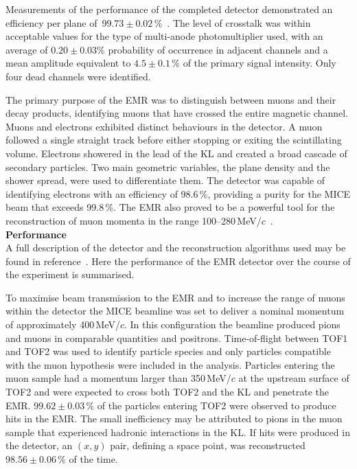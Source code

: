 
Measurements of the performance of the completed detector demonstrated
an efficiency per plane
of~$99.73\pm0.02$\,\%~\cite{2016JInst..11T10007,Drielsma:2017doj}.
The level of crosstalk was within acceptable values for the type of
multi-anode photomultiplier used, with an average of $0.20\pm0.03$\%
probability of occurrence in adjacent channels and a mean amplitude
equivalent to $4.5\pm0.1$\,\% of the primary signal intensity.
Only four dead channels were identified.

The primary purpose of the EMR was to distinguish between muons and
their decay products, identifying muons that have crossed the entire
magnetic channel.
Muons and electrons exhibited distinct behaviours in the detector.
A muon followed a single straight track before either stopping or
exiting the scintillating volume.
Electrons showered in the lead of the KL and created a broad cascade
of secondary particles.
Two main geometric variables, the plane density and the shower spread,
were used to differentiate them.
The detector was capable of identifying electrons with an efficiency
of 98.6\,\%, providing a purity for the MICE beam that exceeds
99.8\,\%.
The EMR also proved to be a powerful tool for the reconstruction of
muon momenta in the range
100--280\,MeV/$c$~\cite{2015JInst..10P2012A}.  \\

\noindent\textbf{Performance} \\
\noindent
A full description of the detector and the reconstruction algorithms
used may be found in reference~\cite{2015JInst..10P2012A}.
Here the performance of the EMR detector over the course of the
experiment is summarised.

To maximise beam transmission to the EMR and to increase the range of
muons within the detector the MICE beamline was set to deliver a
nominal momentum of approximately 400\,MeV/$c$.
In this configuration the beamline produced pions and muons in
comparable quantities and positrons.
Time-of-flight between TOF1 and TOF2 was used to identify particle
species and only particles compatible with the muon hypothesis were
included in the analysis.
Particles entering the muon sample had a momentum larger than
350\,MeV/$c$ at the upstream surface of TOF2 and were expected to
cross both TOF2 and the KL and penetrate the EMR.
$99.62\pm0.03\,\%$ of the particles entering TOF2 were observed to produce
hits in the EMR.
The small inefficiency may be attributed to pions in the muon sample
that experienced hadronic interactions in the KL.
If hits were produced in the detector, an $(x,y)$ pair, defining a
space point, was reconstructed $98.56\pm0.06\,\%$ of the time.

